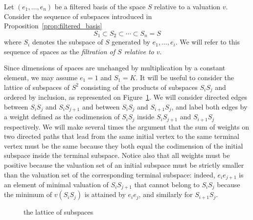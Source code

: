 \documentclass{article}
\theoremstyle{plain}
\theoremstyle{definition}
\theoremstyle{remark}
\begin{document}
Let $(e_1,\ldots ,e_n)$ be a filtered basis of the space $S$
relative to a valuation $v$.
Consider the sequence of
subspaces {introduced in
Proposition~\ref{prop:filtered_basis}}
$$S_1\subset S_2\subset\cdots \subset S_n=S$$
where $S_i$ denotes the subspace of $S$ generated by $e_1,\ldots
,e_i$. We will refer to this sequence of spaces as the {\em
  filtration of $S$ relative to $v$}. 

Since dimensions of spaces are unchanged by multiplication by a
constant element, we may assume $e_1=1$ and $S_1=K$.
It will be useful to consider the lattice of subspaces of $S^2$
consisting of the products of subspaces $S_iS_j$ and ordered by
inclusion, as represented on Figure~\ref{fig:subspaces}. 
We will consider directed edges between $S_iS_j$ and $S_iS_{j+1}$ and
between $S_iS_j$ and $S_{i+1}S_{j}$, and label both edges by a weight
defined as the
codimension of $S_iS_j$ inside $S_iS_{j+1}$ and $S_{i+1}S_{j}$
respectively.
We will make several times the argument that the sum of weights on two
directed paths that lead from the same initial vertex to the same
terminal vertex must be the same because they both equal the
codimension of the initial subspace inside the terminal subspace.
Notice also that all weights must be positive because the valuation
set of an initial subspace must be strictly smaller than the valuation
set of the corresponding terminal subspace: indeed, $e_ie_{j+1}$ is an
element of minimal valuation of $S_iS_{j+1}$ that cannot belong to
$S_iS_j$ because the minimum of $v(S_iS_j)$ is attained by $e_ie_j$,
and similarly for $S_{i+1}S_j$.

\begin{figure}[!h]
  \centering
{}
  \caption{the lattice of subspaces}
  \label{fig:subspaces}
\end{figure}
\end{document}
